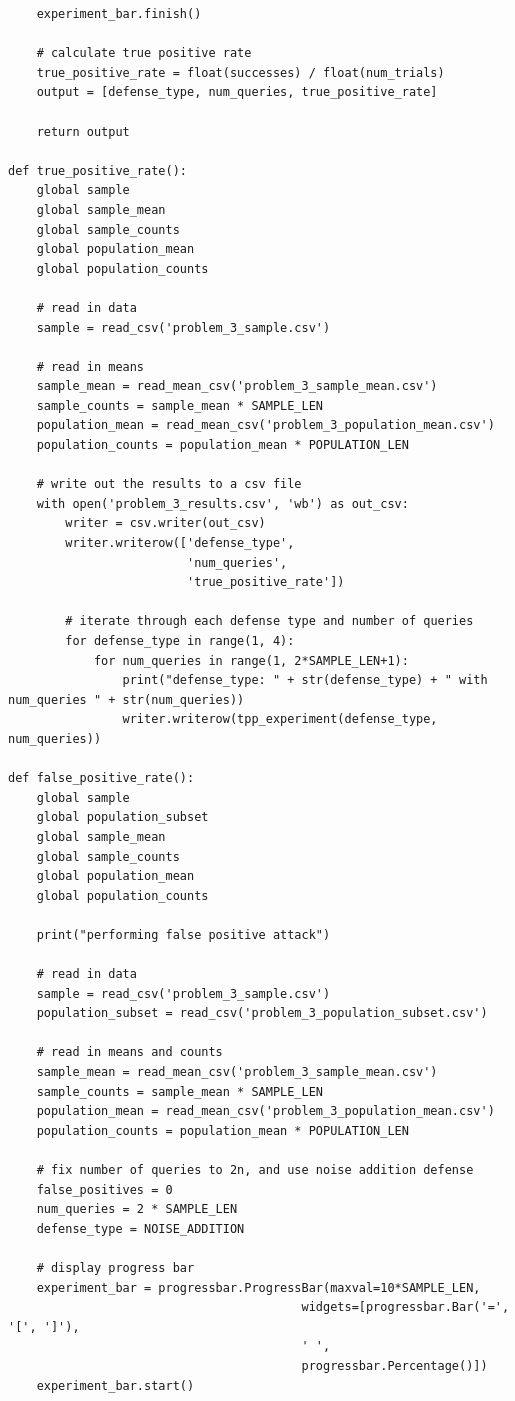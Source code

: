 \documentclass[12pt]{article}
\begin{document}
\begin{appendices}
\begin{lstlisting}
    experiment_bar.finish()

    # calculate true positive rate
    true_positive_rate = float(successes) / float(num_trials)
    output = [defense_type, num_queries, true_positive_rate]

    return output

def true_positive_rate():
    global sample
    global sample_mean
    global sample_counts
    global population_mean
    global population_counts

    # read in data
    sample = read_csv('problem_3_sample.csv')

    # read in means
    sample_mean = read_mean_csv('problem_3_sample_mean.csv')
    sample_counts = sample_mean * SAMPLE_LEN
    population_mean = read_mean_csv('problem_3_population_mean.csv')
    population_counts = population_mean * POPULATION_LEN

    # write out the results to a csv file
    with open('problem_3_results.csv', 'wb') as out_csv:
        writer = csv.writer(out_csv)
        writer.writerow(['defense_type',
                         'num_queries',
                         'true_positive_rate'])

        # iterate through each defense type and number of queries
        for defense_type in range(1, 4):
            for num_queries in range(1, 2*SAMPLE_LEN+1):
                print("defense_type: " + str(defense_type) + " with num_queries " + str(num_queries))
                writer.writerow(tpp_experiment(defense_type, num_queries))

def false_positive_rate():
    global sample
    global population_subset
    global sample_mean
    global sample_counts
    global population_mean
    global population_counts

    print("performing false positive attack")

    # read in data
    sample = read_csv('problem_3_sample.csv')
    population_subset = read_csv('problem_3_population_subset.csv')

    # read in means and counts
    sample_mean = read_mean_csv('problem_3_sample_mean.csv')
    sample_counts = sample_mean * SAMPLE_LEN
    population_mean = read_mean_csv('problem_3_population_mean.csv')
    population_counts = population_mean * POPULATION_LEN

    # fix number of queries to 2n, and use noise addition defense
    false_positives = 0
    num_queries = 2 * SAMPLE_LEN
    defense_type = NOISE_ADDITION

    # display progress bar
    experiment_bar = progressbar.ProgressBar(maxval=10*SAMPLE_LEN,
                                         widgets=[progressbar.Bar('=', '[', ']'),
                                         ' ',
                                         progressbar.Percentage()])
    experiment_bar.start()


\end{lstlisting}
\end{appendices}
\end{document}
